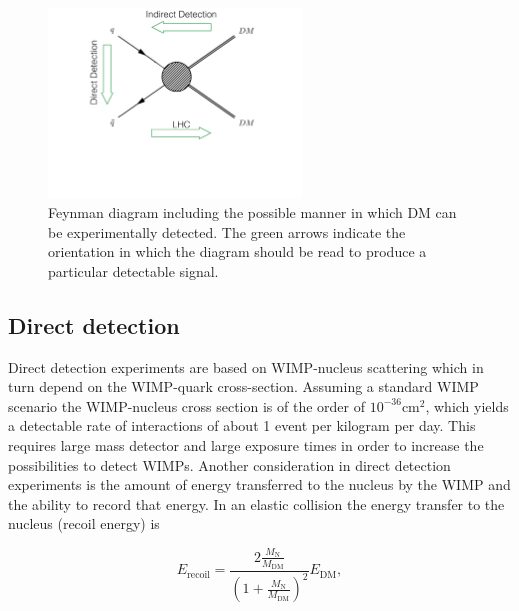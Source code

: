 \begin{figure}
 \centering
\includegraphics[width=0.6\textwidth]{IntroFigures/DiagramDMdetection.pdf}
\caption{Feynman diagram including the possible manner in which DM can
  be experimentally detected. The green arrows indicate the
  orientation in which the diagram should be read to produce a
  particular detectable signal.\label{fig:dmDetection}}
\end{figure}

\subsection{Direct detection}
Direct detection experiments are based on WIMP-nucleus scattering
which in turn depend on the WIMP-quark cross-section. Assuming a
standard WIMP scenario the WIMP-nucleus cross section is of the order
of $10^{-36}$\unit{cm}$^{2}$, which yields a detectable rate of
interactions of about 1 event per kilogram per day. This requires
large mass detector and large exposure times in order to increase the
possibilities to detect WIMPs. Another consideration in direct
detection experiments is the amount of energy transferred to the
nucleus by the WIMP and the ability to record that energy. In an
elastic collision the energy transfer to the nucleus (recoil energy)
is

\begin{equation}
\label{eq:recoilE}
E_{\mathrm{recoil}} = \frac{2\frac{M_{\mathrm{N}}}{M_{\mathrm{DM}}}}{\left(1+\frac{M_{\mathrm{N}}}{M_{\mathrm{DM}}}\right)^{2}}E_{\mathrm{DM}},
\end{equation}


